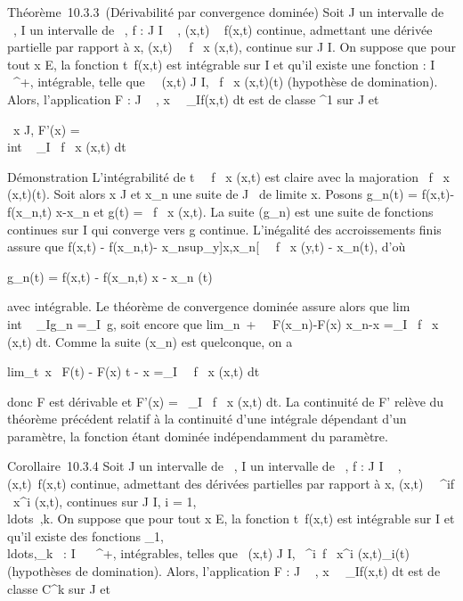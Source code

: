 \documentclass[]{article}
\begin{document}
Théorème~10.3.3~(Dérivabilité par convergence dominée) Soit J un
intervalle de ~, I un intervalle de ~, f : J \times I \rightarrow~ , (x,t) \rightarrow~ f(x,t)
continue, admettant une dérivée partielle par rapport à x,
(x,t)\mapsto~ \partial~f \over \partial~x (x,t),
continue sur J \times I. On suppose que pour tout x \in E, la fonction
t\mapsto~f(x,t) est intégrable sur I et qu'il existe
une fonction \phi : I \rightarrow~ ~^+, intégrable, telle que
\forall~~(x,t) \in J \times I,  \partial~f
\over \partial~x (x,t)\leq \phi(t) (hypothèse de
domination). Alors, l'application F : J \rightarrow~ ,
x\mapsto~\int ~
_If(x,t) dt est de classe ^1 sur J et

\forall~x \in J, F'(x) =\\int ~
_I \partial~f \over \partial~x (x,t) dt

Démonstration L'intégrabilité de t\mapsto~ \partial~f
\over \partial~x (x,t) est claire avec la majoration
 \partial~f \over \partial~x (x,t)\leq \phi(t). Soit
alors x \in J et x_n une suite de J
\diagdown\x\ de limite x. Posons
g_n(t) = f(x,t)-f(x_n,t) \over
x-x_n et g(t) = \partial~f \over \partial~x (x,t). La
suite (g_n) est une suite de fonctions continues sur I qui
converge vers g continue. L'inégalité des accroissements finis assure
que f(x,t) - f(x_n,t)\leqx -
x_nsup_y\in]x,x_n[~\left
 \partial~f \over \partial~x (y,t)\right
\leqx - x_n\phi(t), d'où

g_n(t) = \left 
f(x,t) - f(x_n,t) \over x - x_n
\right \leq \phi(t)

avec \phi intégrable. Le théorème de convergence dominée assure alors que
lim\\int ~
_Ig_n =\int  _I~g, soit
encore que lim_n\rightarrow~+\infty~~
F(x_n)-F(x) \over x_n-x
=\int  _I \partial~f \over \partial~x~
(x,t) dt. Comme la suite (x_n) est quelconque, on a

lim_t\rightarrow~x~ F(t) - F(x)
\over t - x =\int  _I~
\partial~f \over \partial~x (x,t) dt

donc F est dérivable et F'(x) =\int ~
_I \partial~f \over \partial~x (x,t) dt. La continuité de F'
relève du théorème précédent relatif à la continuité d'une intégrale
dépendant d'un paramètre, la fonction étant dominée indépendamment du
paramètre.

Corollaire~10.3.4 Soit J un intervalle de ~, I un intervalle de ~, f : J
\times I \rightarrow~ , (x,t)\mapsto~f(x,t) continue, admettant des
dérivées partielles par rapport à x, (x,t)\mapsto~
\partial~^if \over \partial~x^i (x,t), continues
sur J \times I, i =
1,\\ldots~,k. On
suppose que pour tout x \in E, la fonction
t\mapsto~f(x,t) est intégrable sur I et qu'il existe
des fonctions
\phi_1,\\ldots,\phi_k~
: I \rightarrow~ ~^+, intégrables, telles que
\forall~(x,t) \in J \times I,  \partial~^i~f
\over \partial~x^i (x,t)\leq \phi_i(t)
(hypothèses de domination). Alors, l'application F : J \rightarrow~ ,
x\mapsto~\int ~
_If(x,t) dt est de classe C^k sur J et
\end{document}
